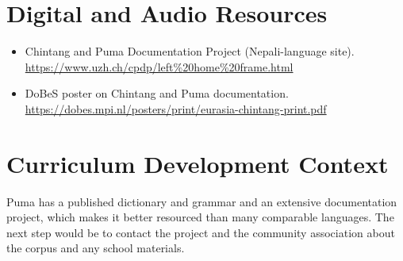 \documentclass[12pt]{article}
\begin{document}
\section{Digital and Audio Resources}
\begin{itemize}
\item Chintang and Puma Documentation Project (Nepali-language site). \url{https://www.uzh.ch/cpdp/left%20home%20frame.html}
\item DoBeS poster on Chintang and Puma documentation. \url{https://dobes.mpi.nl/posters/print/eurasia-chintang-print.pdf}
\end{itemize}

\section{Curriculum Development Context}
Puma has a published dictionary and grammar and an extensive documentation project, which makes it better resourced than many comparable languages. The next step would be to contact the project and the community association about the corpus and any school materials.
\end{document}
